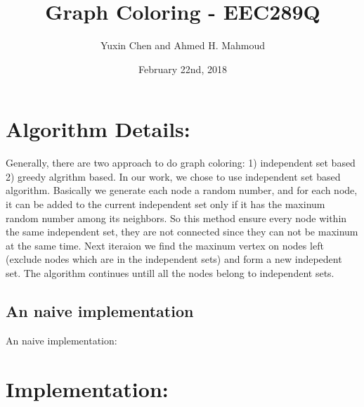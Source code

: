 \documentclass[12pt] {article}
\begin{document}
\title{Graph Coloring -  EEC289Q}
\author{Yuxin Chen and Ahmed H. Mahmoud}
\date{February 22nd, 2018}
\maketitle

\section{Algorithm Details:}
Generally, there are two approach to do graph coloring: 1) independent set based 2) greedy algrithm based. In our work, we chose to use independent set based algorithm. Basically we generate each node a random number, and for each node, it can be added to the current independent set only if it has the maxinum random number among its neighbors. So this method ensure every node within the same independent set, they are not connected since they can not be maxinum at the same time. Next iteraion we find the maxinum vertex on nodes left (exclude nodes which are in the independent sets) and form a new indepedent set. The algorithm continues untill all the nodes belong to independent sets.

\subsection{An naive implementation}
An naive implementation: 



\section{Implementation:}
\end{document}

